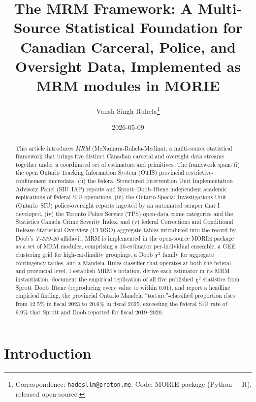 \documentclass[11pt,a4paper]{article}
\title{The MRM Framework: A Multi-Source Statistical Foundation
       for Canadian Carceral, Police, and Oversight Data,
       Implemented as MRM modules in MORIE}
\author{Vansh Singh Ruhela\thanks{%
  Correspondence: \texttt{hadesllm@proton.me}.
  Code: MORIE package (Python + R), released open-source.}}
\date{2026-05-09}
\theoremstyle{plain}
\theoremstyle{definition}
\theoremstyle{remark}
\begin{document}
\maketitle

\begin{abstract}
This article introduces \emph{MRM} (McNamara-Ruhela-Medina), a
multi-source statistical framework that brings five distinct
Canadian carceral and oversight data streams together under a
coordinated set of estimators and primitives. The framework spans (i)
the open Ontario Tracking Information System (OTIS) provincial
restrictive-confinement microdata, (ii) the federal Structured
Intervention Unit Implementation Advisory Panel (SIU~IAP)
reports and Sprott--Doob--Iftene independent academic
replications of federal SIU operations, (iii) the Ontario
Special Investigations Unit (Ontario~SIU) police-oversight
reports ingested by an automated scraper that I developed, (iv)
the Toronto Police Service (TPS) open-data crime categories and
the Statistics Canada Crime Severity Index, and (v) federal
Corrections and Conditional Release Statistical Overview (CCRSO)
aggregate tables introduced into the record by Doob's
\emph{T-539-20} affidavit. MRM is implemented in the
open-source MORIE package as a set of MRM modules,
comprising a 10-estimator per-individual ensemble, a GEE
clustering grid for high-cardinality groupings, a Doob
$\chi^{2}$ family for aggregate contingency tables, and a
Mandela~Rules classifier that operates at both the federal and
provincial level. I establish MRM's notation, derive each
estimator in its MRM instantiation, document the empirical
replication of all five published $\chi^{2}$ statistics from
Sprott--Doob--Iftene (reproducing every value to within $0.01$),
and report a headline empirical finding: the provincial Ontario
Mandela ``torture''-classified proportion rises from $12.5\%$ in
fiscal 2023 to $20.6\%$ in fiscal 2025, exceeding the federal
SIU rate of $9.9\%$ that Sprott and Doob reported for fiscal
2019--2020.
\end{abstract}

\section{Introduction}
\label{sec:intro}
\end{document}
